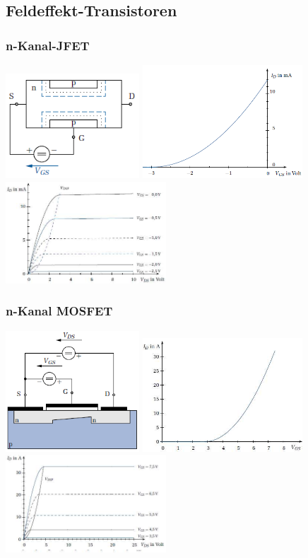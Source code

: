\subsection{Feldeffekt-Transistoren}

\subsubsection{n-Kanal-JFET}
\includegraphics[width=5cm]{images/jFET}
\includegraphics[width=6cm]{images/jFetSteuerKennlinie}
\includegraphics[width=6cm]{images/jFetAusgangsKennlinie}\\

\subsubsection{n-Kanal MOSFET}

\includegraphics[width=5cm]{images/MOSFET}
\includegraphics[width=6cm]{images/MOSFETSteuerKennlinie}
\includegraphics[width=6cm]{images/MOSFETAusgangsKennlinie}\\